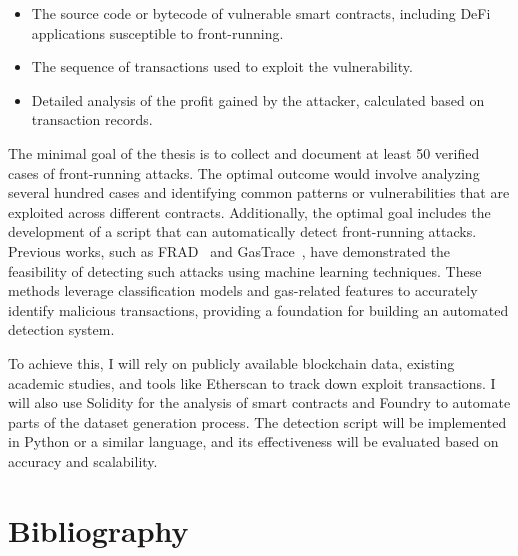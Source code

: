 \documentclass{scrartcl}
\begin{document}
\begin{itemize}
	\item The source code or bytecode of vulnerable smart contracts, including DeFi applications susceptible to front-running.
	\item The sequence of transactions used to exploit the vulnerability.
	\item Detailed analysis of the profit gained by the attacker, calculated based on transaction records.
\end{itemize}

The minimal goal of the thesis is to collect and document at least 50 verified cases of front-running attacks. The optimal outcome would involve analyzing several hundred cases and identifying common patterns or vulnerabilities that are exploited across different contracts. Additionally, the optimal goal includes the development of a script that can automatically detect front-running attacks. Previous works, such as FRAD~\cite{FRAD24} and GasTrace~\cite{GasTrace26}, have demonstrated the feasibility of detecting such attacks using machine learning techniques. These methods leverage classification models and gas-related features to accurately identify malicious transactions, providing a foundation for building an automated detection system.

To achieve this, I will rely on publicly available blockchain data, existing academic studies, and tools like Etherscan to track down exploit transactions. I will also use Solidity for the analysis of smart contracts and Foundry to automate parts of the dataset generation process. The detection script will be implemented in Python or a similar language, and its effectiveness will be evaluated based on accuracy and scalability.


\section*{Bibliography}

\nocite{*}

\end{document}
